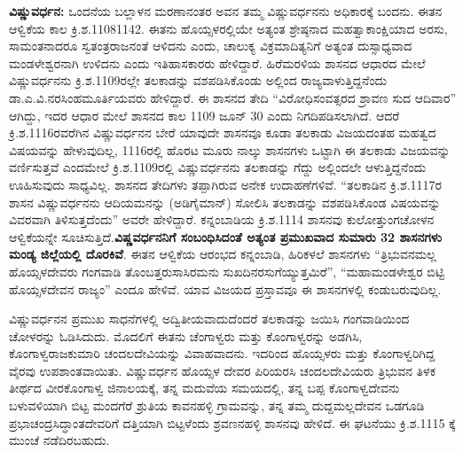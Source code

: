 \textbf{ವಿಷ್ಣುವರ್ಧನ:} ಒಂದನೆಯ ಬಲ್ಲಾಳನ ಮರಣಾನಂತರ ಅವನ ತಮ್ಮ ವಿಷ್ಣುವರ್ಧನನು ಅಧಿಕಾರಕ್ಕೆ ಬಂದನು. ಈತನ ಆಳ್ವಿಕೆಯ ಕಾಲ ಕ್ರಿ.ಶ.1108\enginline{-}1142. ಈತನು ಹೊಯ್ಸಳರಲ್ಲಿಯೇ ಅತ್ಯಂತ ಶ್ರೇಷ್ಠನಾದ ಮಹತ್ವಾಕಾಂಕ್ಷಿಯಾದ ಅರಸು, ಸಾಮಂತನಾದರೂ ಸ್ವತಂತ್ರರಾಜನಂತೆ ಆಳಿದನು ಎಂದು, ಚಾಲುಕ್ಯ ವಿಕ್ರಮಾದಿತ್ಯನಿಗೆ ಅತ್ಯಂತ ದುಸ್ಸಾಧ್ಯವಾದ ಮಂಡಳೇಶ್ವರನಾಗಿ ಉಳಿದನು ಎಂದು ಇತಿಹಾಸಕಾರರು ಹೇಳಿದ್ದಾರೆ. ಹಿರೆಮರಳಿಯ ಶಾಸನದ ಆಧಾರದ ಮೇಲೆ ವಿಷ್ಣುವರ್ಧನನು ಕ್ರಿ.ಶ.1109ರಲ್ಲೇ ತಲಕಾಡನ್ನು ವಶಪಡಿಸಿಕೊಂಡು ಅಲ್ಲಿಂದ ರಾಜ್ಯವಾಳುತ್ತಿದ್ದನೆಂದು ಡಾ.ಎ.ವಿ.ನರಸಿಂಹ\-ಮೂರ್ತಿಯವರು ಹೇಳಿದ್ದಾರೆ. ಈ ಶಾಸನದ ತೇದಿ “ವಿರೋಧಿಸಂವತ್ಸರದ ಶ್ರಾವಣ ಸುದ ಆದಿವಾರ” ಆಗಿದ್ದು, ಇದರ ಆಧಾರ ಮೇಲೆ ಶಾಸನದ ಕಾಲ 1109 ಜೂನ್​ 30 ಎಂದು ನಿಗದಿಪಡಿಸಲಾಗಿದೆ. ಆದರೆ ಕ್ರಿ.ಶ.1116ರವರೆಗಿನ ವಿಷ್ಣುವರ್ಧನನ ಬೇರೆ ಯಾವುದೇ ಶಾಸನವೂ ಕೂಡಾ ತಲಕಾಡು ವಿಜಯದಂತಹ ಮಹತ್ವದ ವಿಷಯವನ್ನು ಹೇಳುವುದಿಲ್ಲ, 1116ರಲ್ಲಿ ಹೊರಟ ಮೂರು ನಾಲ್ಕು ಶಾಸನಗಳು ಒಟ್ಟಾಗಿ ಈ ತಲಕಾಡು ವಿಜಯವನ್ನು ವರ್ಣಿಸುತ್ತವೆ ಎಂದಮೇಲೆ ಕ್ರಿ.ಶ.1109ರಲ್ಲಿ ವಿಷ್ಣುವರ್ಧನನು ತಲಕಾಡನ್ನು ಗೆದ್ದು ಅಲ್ಲಿಂದಲೇ ಆಳುತ್ತಿದ್ದನೆಂದು ಊಹಿಸುವುದು ಸಾಧ್ಯವಿಲ್ಲ. ಶಾಸನದ ತೇದಿಗಳು ತಪ್ಪಾಗಿರುವ ಅನೇಕ ಉದಾಹಣೆಗಳಿವೆ. “ತಲಕಾಡಿನ ಕ್ರಿ.ಶ.1117ರ ಶಾಸನ ವಿಷ್ಣುವರ್ಧನನು ಆದಿಯಮನನ್ನು (ಅಡಿಗೈಮಾನ್​) ಸೋಲಿಸಿ ತಲಕಾಡನ್ನು ವಶಪಡಿಸಿಕೊಂಡ ವಿಷಯವನ್ನು ವಿವರವಾಗಿ ತಿಳಿಸುತ್ತದೆಂದು” ಅವರೇ ಹೇಳಿದ್ದಾರೆ. ಕನ್ನಂಬಾಡಿಯ ಕ್ರಿ.ಶ.1114 ಶಾಸನವು ಕುಲೋತ್ತುಂಗಚೋಳನ ಆಳ್ವಿಕೆಯನ್ನೇ ಸೂಚಿಸುತ್ತಿದೆ.\textbf{ವಿಷ್ಣವರ್ಧನನಿಗೆ ಸಂಬಂಧಿಸಿ\-ದಂತೆ ಅತ್ಯಂತ ಪ್ರಮುಖವಾದ ಸುಮಾರು 32 ಶಾಸನಗಳು ಮಂಡ್ಯ ಜಿಲ್ಲೆಯಲ್ಲಿ ದೊರಕಿವೆ}. ಈತನ ಆಳ್ವಿಕೆಯ ಆರಂಭದ ಕನ್ನಂಬಾಡಿ, ಹಿರಿಕಳಲೆ ಶಾಸನಗಳು “ತ್ರಿಭುವನಮಲ್ಲ ಹೊಯ್ಸಳದೇವರು ಗಂಗವಾಡಿ ತೊಂಬತ್ತರುಸಾಸಿರಮನು ಸುಖದಿನರಸು\-ಗೆಯ್ಯುತ್ತಮಿರೆ”, “ಮಹಾಮಂಡಳೇಶ್ವರ ಬಿಟ್ಟಿ ಹೊಯ್ಸಳದೇವನ ರಾಜ್ಯಂ” ಎಂದೂ ಹೇಳಿವೆ. ಯಾವ ವಿಜಯದ ಪ್ರಸ್ತಾವವೂ ಈ ಶಾಸನಗಳಲ್ಲಿ ಕಂಡುಬರುವುದಿಲ್ಲ.

ವಿಷ್ಣುವರ್ಧನನ ಪ್ರಮುಖ ಸಾಧನೆಗಳಲ್ಲಿ ಅದ್ವಿತೀಯವಾದುದೆಂದರೆ ತಲಕಾಡನ್ನು ಜಯಿಸಿ ಗಂಗವಾಡಿಯಿಂದ ಚೋಳರನ್ನು ಓಡಿಸಿದುದು. ಮೊದಲಿಗೆ ಈತನು ಚೆಂಗಾಳ್ವರು ಮತ್ತು ಕೊಂಗಾಳ್ವರನ್ನು ಅಡಗಿಸಿ, ಕೊಂಗಾಳ್ವರಾಜಕುಮಾರಿ ಚಂದಲದೇವಿಯನ್ನು ವಿವಾಹವಾದನು. ಇದರಿಂದ ಹೊಯ್ಸಳರು ಮತ್ತು ಕೊಂಗಾಳ್ವರಿಗಿದ್ದ ವೈರವು ಉಪಶಾಂತವಾಯಿತು. ವಿಷ್ಣುವರ್ಧನ ಹೊಯ್ಸಳ ದೇವರ ಪಿರಿಯರಸಿ ಚಂದಲದೇವಿಯರು ತ್ರಿಭುವನ ತಿಳಕ ತೀರ್ಥದ ವೀರಕೊಂಗಾಳ್ವ ಜಿನಾಲಯಕ್ಕೆ, ತನ್ನ ಮದುವೆಯ ಸಮಯದಲ್ಲಿ, ತನ್ನ ಬಪ್ಪ ಕೊಂಗಾಳ್ವದೇವನು ಬಳುವಳಿಯಾಗಿ ಬಿಟ್ಟ ಮಂದಗೆರೆ ಶ್ರುತಿಯ ಕಾವನಹಳ್ಳಿ ಗ್ರಾಮವನ್ನು, ತನ್ನ ತಮ್ಮ ದುದ್ದಮಲ್ಲದೇವನ ಒಡಗೂಡಿ ಪ್ರಭಾಚಂದ್ರಸಿದ್ಧಾಂತದೇವರಿಗೆ ದತ್ತಿಯಾಗಿ ಬಿಟ್ಟಳೆಂದು ಶ್ರವಣನಹಳ್ಳಿ ಶಾಸನವು ಹೇಳಿದೆ. ಈ ಘಟನೆಯು ಕ್ರಿ.ಶ.1115 ಕ್ಕೆ ಮುಂಚೆ ನಡೆದಿರಬಹುದು.


